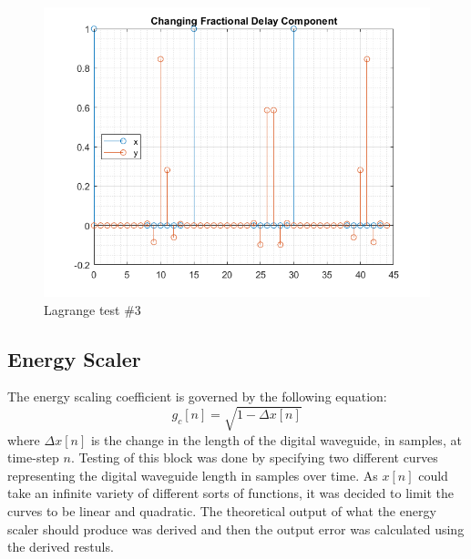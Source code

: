 \documentclass[../main.tex]{subfiles}
\begin{document}
\begin{figure}[h]
    \centering
    \includegraphics[scale=.65]{./images/plots/LagrangeTest3.png}
    \caption{Lagrange test \#3}
    \label{fig:LagrangeTest3}
\end{figure}

\clearpage

\subsection{Energy Scaler}
The energy scaling coefficient is governed by the following equation:
\begin{equation}
    g_c[n] = \sqrt{1-\Delta x[n]}
\end{equation}
where $\Delta x[n]$ is the change in the length of the digital waveguide, in samples, at time-step $n$. Testing of this block was done by specifying two different curves representing the digital waveguide length in samples over time. As $x[n]$ could take an infinite variety of different sorts of functions, it was decided to limit the curves to be linear and quadratic. The theoretical output of what the energy scaler should produce was derived and then the output error was calculated using the derived restuls.
\end{document}
